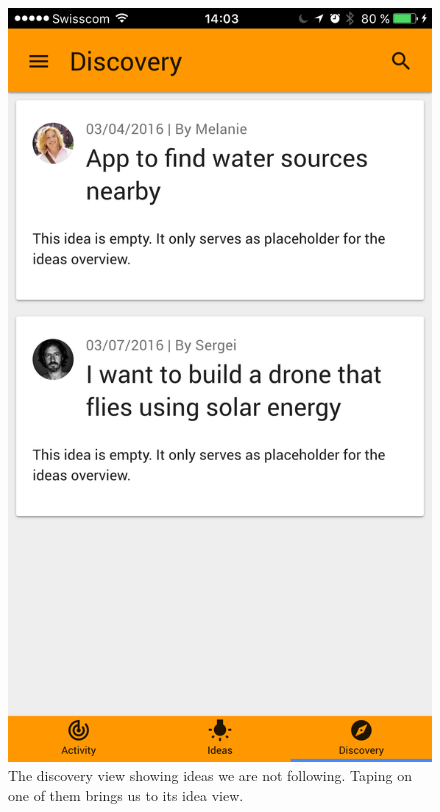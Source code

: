 \documentclass[a4paper,12pt,twoside]{article}
\begin{document}
\begin{figure}[!htb]
    \begin{minipage}[t]{.48\textwidth}
        \centering
        \includegraphics[width=.67\textwidth]{images/flow_follow_1.png}
        \caption{The discovery view showing ideas we are not following. Taping on one of them brings us to its idea view.}
    \end{minipage}
    \hfill
    \begin{minipage}[t]{.48\textwidth}
        \centering

\end{minipage}
\end{figure}
\end{document}
